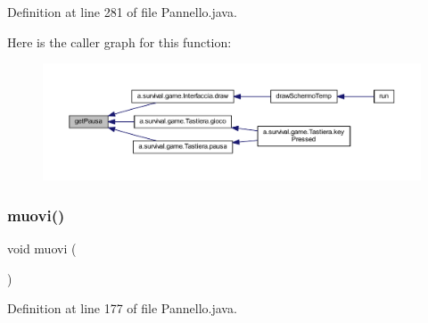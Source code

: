 Definition at line 281 of file Pannello.\+java.

Here is the caller graph for this function\+:
\nopagebreak
\begin{figure}[H]
\begin{center}
\leavevmode
\includegraphics[width=350pt]{classa_1_1survival_1_1game_1_1_pannello_a6e565369e7a4cd8bee8616ba06ebae08_icgraph}
\end{center}
\end{figure}
\mbox{\label{classa_1_1survival_1_1game_1_1_pannello_a1fe2f184b3cc7345c6a0f08d183a1d0b}} 
\subsubsection{\texorpdfstring{muovi()}{muovi()}}
{\footnotesize\ttfamily void muovi (\begin{DoxyParamCaption}{ }\end{DoxyParamCaption})}



Definition at line 177 of file Pannello.\+java.

